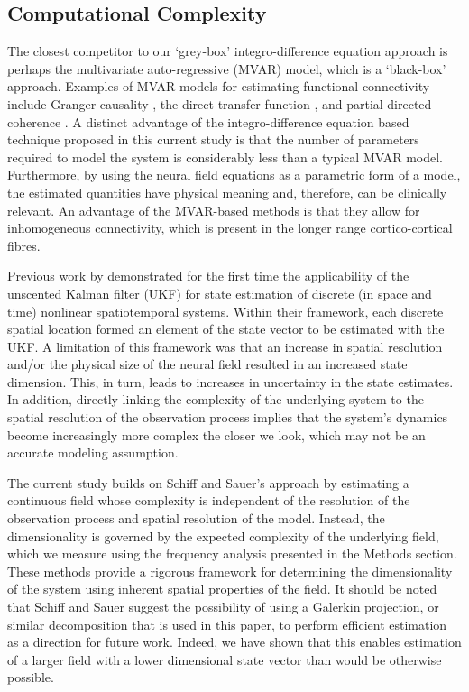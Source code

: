 \documentclass[review,authoryear,3p]{elsarticle}
\begin{document}
\subsection{Computational Complexity}
The closest competitor to our `grey-box' integro-difference equation approach is perhaps the multivariate auto-regressive (MVAR) model, which is a `black-box' approach. Examples of MVAR models for estimating functional connectivity include Granger causality \citep{Hesse2003}, the direct transfer function \citep{Kaminski1991}, and partial directed coherence \citep{Sameshima1999}. A distinct advantage of the integro-difference equation based technique proposed in this current study is that the number of parameters required to model the system is considerably less than a typical MVAR model. Furthermore, by using the neural field equations as a parametric form of a model, the estimated quantities have physical meaning and, therefore, can be clinically relevant. An advantage of the MVAR-based methods is that they allow for inhomogeneous connectivity, which is present in the longer range cortico-cortical fibres. 

Previous work by \citet{schiff2008kalman} demonstrated for the first time the applicability of the unscented Kalman filter (UKF) for state estimation of discrete (in space and time) nonlinear spatiotemporal systems. Within their framework, each discrete spatial location formed an element of the state vector to be estimated with the UKF. A limitation of this framework was that an increase in spatial resolution and/or the physical size of the neural field resulted in an increased state dimension. This, in turn, leads to increases in uncertainty in the state estimates. In addition, directly linking the complexity of the underlying system to the spatial resolution of the observation process implies that the system's dynamics become increasingly more complex the closer we look, which may not be an accurate modeling assumption.

The current study builds on Schiff and Sauer's approach by estimating a continuous field whose complexity is independent of the resolution of the observation process and spatial resolution of the model. Instead, the dimensionality is governed by the expected complexity of the underlying field, which we measure using the frequency analysis presented in the Methods section. These methods provide a rigorous framework for determining the dimensionality of the system using inherent spatial properties of the field. It should be noted that Schiff and Sauer suggest the possibility of using a Galerkin projection, or similar decomposition that is used in this paper, to perform efficient estimation as a direction for future work. Indeed, we have shown that this enables estimation of a larger field with a lower dimensional state vector than would be otherwise possible. 
\end{document}
